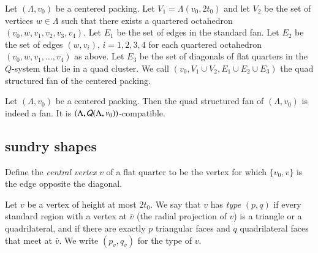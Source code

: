 \begin{definition}
Let $(\Lambda,v_0)$ be a centered packing.   Let $V_1 = \Lambda(v_0,2t_0)$
and let $V_2$ be the set of vertices $w\in  \Lambda$ such that there
exists a quartered octahedron $(v_0,w,v_1,v_2,v_3,v_4)$.  Let $E_1$
be the set of edges in the standard fan.  Let $E_2$ be the set of
edges $(w,v_i)$, $i=1,2,3,4$ for each quartered octahedron $(v_0,w,v_1,\ldots,v_4)$ as above.  Let $E_3$ be the set of diagonals of flat quarters in
the $Q$-system that lie in a quad cluster.  
We call $(v_0,V_1\cup V_2,E_1\cup E_2 \cup E_3)$ the quad structured fan of the centered packing.
\end{definition}


\begin{lemma}
Let $(\Lambda,v_0)$ be a centered packing.  Then the quad structured fan
of $(\Lambda,v_0)$ is indeed a fan.  
It is $(\Lambda,{\mathcal Q}(\Lambda,v_0))$-compatible.
\end{lemma}


\subsection{sundry shapes}



\begin{definition}
Define the {\it central vertex\/} $v$ of a flat quarter to be the
vertex for which $\{v_0,v\}$ is the edge opposite the diagonal.
\end{definition}


\begin{definition}
Let $v$ be a vertex of height at most $2t_0$.  We say that $v$ has
{\it type\/} $(p,q)$ if every standard region with a vertex at $\bar
v$ (the radial projection of $v$) is a triangle or a quadrilateral,
and if there are exactly $p$ triangular faces and $q$ quadrilateral
faces that meet at $\bar v$.  We write $(p_v,q_v)$ for the type of
$v$.
\end{definition}


